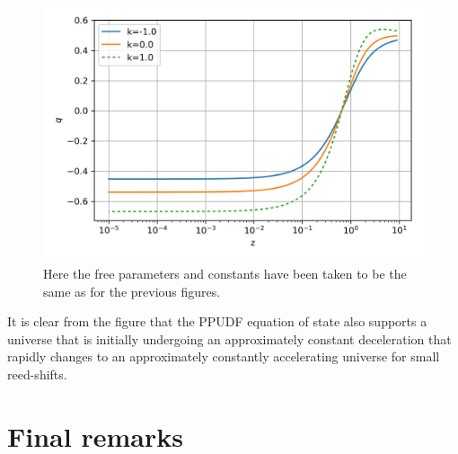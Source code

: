 \documentclass[a4paper, 11pt]{FSKH_623_Report}
\numberwithin{equation}{section}
\begin{document}
\begin{figure}[H]
\centering
\includegraphics[scale=1]{Figures/UDF_q.jpg}
\caption{Here the free parameters and constants have been taken to be the same as for the previous figures.}
\label{fig:UDFq}
\end{figure}
It is clear from the figure that the PPUDF equation of state also supports a universe that is initially undergoing an approximately constant deceleration that rapidly changes to an approximately constantly accelerating universe for small reed-shifts.

\chapter{Final remarks}
\end{document}
